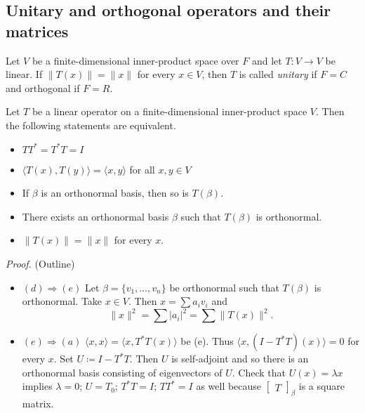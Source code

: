 \documentclass[12pt]{article}
\newenvironment{theorem}[2][Theorem]{\begin{trivlist}
\item[\hskip \labelsep {\bfseries #1}\hskip \labelsep {\bfseries #2.}]}{\end{trivlist}}
\newenvironment{definition}[2][Definition]{\begin{trivlist}
\item[\hskip \labelsep {\bfseries #1}\hskip \labelsep {\bfseries #2}]}{\end{trivlist}}
\begin{document}
\subsection{Unitary and orthogonal operators and their matrices}

\begin{definition}{9}
Let $V$ be a finite-dimensional inner-product space over $F$ and let $T : V \to V$ be linear. If $\lVert T(x) \rVert = \lVert x \rVert$ for every $x \in V$, then $T$ is called \textit{unitary} if $F = C$ and orthogonal if $F = R$. 
\end{definition}

\begin{theorem}{6.18}
Let $T$ be a linear operator on a finite-dimensional inner-product space $V$. Then the following statements are equivalent.

\begin{itemize}
    \item[(a)] $TT^* = T^*T = I$
    
    \item[(b)] $\langle T(x), T(y) \rangle = \langle x, y \rangle$ for all $x, y \in V$
    
    \item[(c)] If $\beta$ is an orthonormal basis, then so is $T(\beta)$.
    
    \item[(d)] There exists an orthonormal basis $\beta$ such that $T(\beta)$ is orthonormal.
    
    \item[(e)] $\lVert T(x) \lVert = \lVert x \rVert$ for every $x$.
\end{itemize}
\end{theorem}

\textit{Proof.} (Outline) 

\begin{itemize}
    \item $(d) \Longrightarrow (e)$ Let $\beta = \{v_1, \dots, v_n\}$ be orthonormal such that $T(\beta)$ is orthonormal. Take $x \in V$. Then $x = \sum a_iv_i$ and $$\lVert x \rVert^2 = \sum \lvert a_i \rvert^2 = \sum \lVert T(x) \rVert^2.$$  
    
    \item $(e) \Longrightarrow (a)$ $\langle x, x \rangle = \langle x, T^*T(x) \rangle$ be (e). Thus $\langle x, (I - T^*T)(x) \rangle = 0$ for every $x$. Set $U \coloneqq I - T^*T$. Then $U$ is self-adjoint and so there is an orthonormal basis consisting of eigenvectors of $U$. Check that $U(x) = \lambda x$ implies $\lambda = 0$; $U = T_0$; $T^*T = I$; $TT^* = I$ as well because $\begin{bmatrix} T \end{bmatrix}_\beta$ is a square matrix.
\end{itemize}
\end{document}

